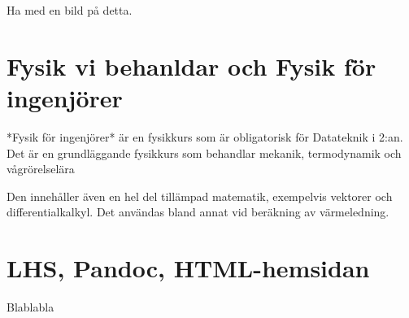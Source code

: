 \begin{binge}
Ha med en bild på detta.

\section{Fysik vi behanldar och Fysik för ingenjörer}

*Fysik för ingenjörer* är en fysikkurs som är obligatorisk för Datateknik i 2:an. Det är en grundläggande fysikkurs som behandlar mekanik, termodynamik och vågrörelselära

Den innehåller även en hel del tillämpad matematik, exempelvis vektorer och differentialkalkyl. Det användas bland annat vid beräkning av värmeledning.

\section{LHS, Pandoc, HTML-hemsidan}

Blablabla

\end{binge}